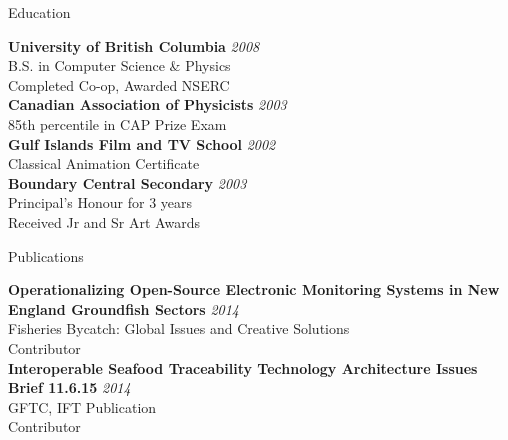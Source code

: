 \documentclass{resume} %
\begin{document}
\begin{rSection}{Education}

{\bf University of British Columbia} \hfill {\em 2008} \\ 
B.S. in Computer Science \& Physics \\
Completed Co-op, Awarded NSERC \\

{\bf Canadian Association of Physicists} \hfill {\em 2003} \\ 
85th percentile in CAP Prize Exam \\

{\bf Gulf Islands Film and TV School} \hfill {\em 2002} \\ 
Classical Animation Certificate \\

{\bf Boundary Central Secondary} \hfill {\em 2003} \\ 
Principal's Honour for 3 years \\
Received Jr and Sr Art Awards \\

\end{rSection}


\begin{rSection}{Publications}

{\bf Operationalizing Open-Source Electronic Monitoring Systems in New England Groundfish Sectors} \hfill {\em 2014} \\ 
Fisheries Bycatch: Global Issues and Creative Solutions \\
Contributor \\

{\bf Interoperable Seafood Traceability Technology Architecture Issues Brief 11.6.15} \hfill {\em 2014} \\ 
GFTC, IFT Publication \\
Contributor \\

\end{rSection}
\end{document}
